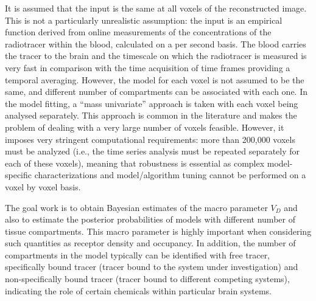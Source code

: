 It is assumed that the input is the same at all voxels of the reconstructed
image. This is not a particularly unrealistic assumption: the input is an
empirical function derived from online measurements of the concentrations
of the radiotracer within the blood, calculated on a per second basis. The
blood carries the tracer to the brain and the timescale on which the
radiotracer is measured is very fast in comparison with the time
acquisition of \pet time frames providing a temporal averaging. However,
the model for each voxel is not assumed to be the same, and different
number of compartments can be associated with each one. In the model
fitting, a ``mass univariate'' approach is taken with each voxel being
analysed separately. This approach is common in the literature and makes
the problem of dealing with a very large number of voxels feasible.
However, it imposes very stringent computational requirements: more than
200,000 voxels must be analyzed (i.e., the time series analysis must be
repeated separately for each of these voxels), meaning that robustness is
essential as complex model-specific characterizations and model/algorithm
tuning cannot be performed on a voxel by voxel basis.

The goal work is to obtain Bayesian estimates of the macro parameter $V_D$ and
also to estimate the posterior probabilities of models with different number
of tissue compartments. This macro parameter is highly important when
considering such quantities as receptor density and occupancy. In addition,
the number of compartments in the model typically can be identified with free
tracer, specifically bound tracer (tracer bound to the system under
investigation) and non-specifically bound tracer (tracer bound to different
competing systems), indicating the role of certain chemicals within particular
brain systems.

